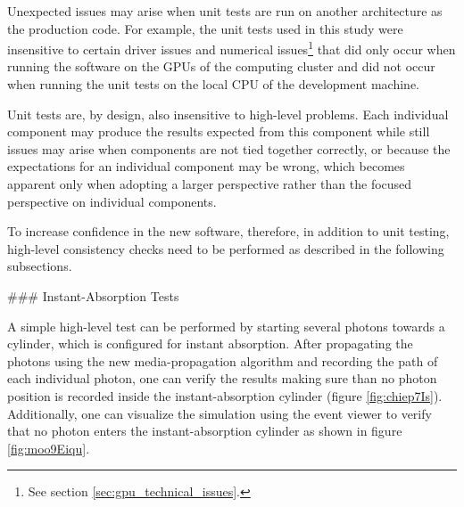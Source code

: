 Unexpected issues may arise when unit tests are run on another architecture as the production code. For example, the unit tests used in this study were insensitive to certain driver issues and numerical issues\footnote{See section \ref{sec:gpu_technical_issues}.} that did only occur when running the software on the GPUs of the computing cluster and did not occur when running the unit tests on the local CPU of the development machine.

Unit tests are, by design, also insensitive to high-level problems. Each individual component may produce the results expected from this component while still issues may arise when components are not tied together correctly, or because the expectations for an individual component may be wrong, which becomes apparent only when adopting a larger perspective rather than the focused perspective on individual components.

To increase confidence in the new software, therefore, in addition to unit testing, high-level consistency checks need to be performed as described in the following subsections.


### Instant-Absorption Tests
\label{sec:instant_absorption_tests}

A simple high-level test can be performed by starting several photons towards a cylinder, which is configured for instant absorption. After propagating the photons using the new media-propagation algorithm and recording the path of each individual photon, one can verify the results making sure than no photon position is recorded inside the instant-absorption cylinder (figure \ref{fig:chiep7Is}).
Additionally, one can visualize the simulation using the \steamshovel event viewer to verify that no photon enters the instant-absorption cylinder as shown in figure \ref{fig:moo9Eiqu}.


